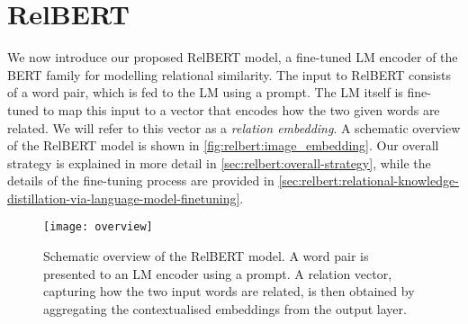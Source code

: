 \documentclass[3p]{elsarticle}
\begin{document}
{%

\section{RelBERT} \label{sec:relbert:relbert}
We now introduce our proposed RelBERT model, a fine-tuned LM encoder of the BERT family for modelling relational similarity. The input to RelBERT consists of a word pair, which is fed to the LM using a prompt. The LM itself is fine-tuned to map this input to a vector that encodes how the two given words are related. We will refer to this vector as a \emph{relation embedding}. A schematic overview of the RelBERT model is shown in \autoref{fig:relbert:image_embedding}. Our overall strategy is explained in more detail in \autoref{sec:relbert:overall-strategy}, while the details of the fine-tuning process are provided in \autoref{sec:relbert:relational-knowledge-distillation-via-language-model-finetuning}.

\begin{figure}[t]
    \centering
    \texttt{[image: overview]}
    \caption{Schematic overview of the RelBERT model. A word pair is presented to an LM encoder using a prompt. A relation vector, capturing how the two input words are related, is then obtained by aggregating the contextualised embeddings from the output layer.}
    \label{fig:relbert:image_embedding}
\end{figure}

}
\end{document}
